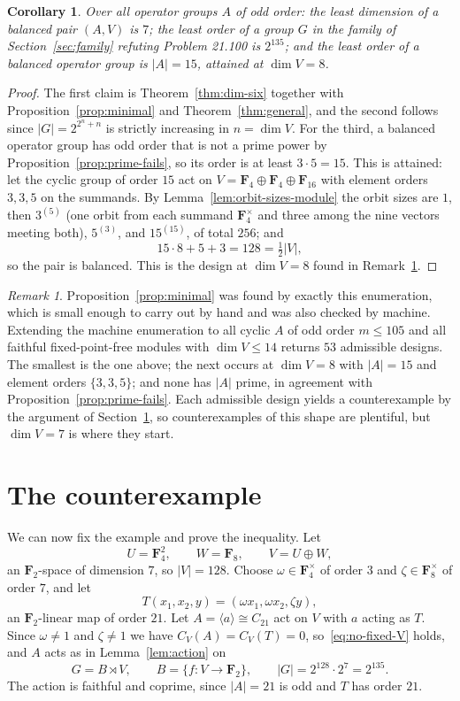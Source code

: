 \documentclass[11pt,a4paper,reqno]{amsart}
\newtheorem{corollary}[theorem]{Corollary}
\theoremstyle{definition}
\theoremstyle{remark}
\newtheorem{remark}[theorem]{Remark}
\newcommand{\F}{\mathbf F}
\begin{document}
\begin{corollary}\label{cor:minima}
Over all operator groups $A$ of odd order:
the least dimension of a balanced pair $(A,V)$ is $7$; the least order
of a group $G$ in the family of Section~\ref{sec:family} refuting
Problem 21.100 is $2^{135}$; and the least order of a balanced operator
group is $|A|=15$, attained at $\dim V=8$.
\end{corollary}

\begin{proof}
The first claim is Theorem~\ref{thm:dim-six} together with
Proposition~\ref{prop:minimal} and Theorem~\ref{thm:general}, and the
second follows since
$|G|=2^{2^n+n}$ is strictly increasing in $n=\dim V$.  For the third,
a balanced operator group has odd order that is not a prime power by
Proposition~\ref{prop:prime-fails}, so its order is at least
$3\cdot5=15$.  This is attained: let the cyclic group of order
$15$ act on $V=\F_4\oplus\F_4\oplus\F_{16}$ with element orders
$3,3,5$ on the summands.  By Lemma~\ref{lem:orbit-sizes-module} the
orbit sizes are $1$, then $3^{(5)}$ (one orbit from each summand
$\F_4^\times$ and three among the nine vectors meeting both),
$5^{(3)}$, and $15^{(15)}$, of total $256$; and
\[
 15\cdot8+5+3=128=\tfrac12|V| ,
\]
so the pair is balanced.  This is the design at $\dim V=8$ found in
Remark~\ref{rem:search}.
\end{proof}

\begin{remark}\label{rem:search}
Proposition~\ref{prop:minimal} was found by exactly this enumeration,
which is small enough to carry out by hand and was also checked by
machine.  Extending the machine enumeration to all cyclic $A$ of odd
order $m\le105$ and all faithful fixed-point-free modules with
$\dim V\le14$ returns $53$ admissible designs.  The smallest is the one
above; the next occurs at $\dim V=8$ with $|A|=15$ and element orders
$\{3,3,5\}$; and none has $|A|$ prime, in agreement with
Proposition~\ref{prop:prime-fails}.  Each admissible design yields a
counterexample by the argument of Section~\ref{sec:short}, so
counterexamples of this shape are plentiful, but $\dim V=7$ is where
they start.
\end{remark}

\section{The counterexample}\label{sec:short}

We can now fix the example and prove the inequality.  Let
\[
 U=\F_4^2,\qquad W=\F_8,\qquad V=U\oplus W,
\]
an $\F_2$-space of dimension $7$, so $|V|=128$.  Choose
$\omega\in\F_4^\times$ of order $3$ and $\zeta\in\F_8^\times$ of order
$7$, and let
\[
 T(x_1,x_2,y)=(\omega x_1,\omega x_2,\zeta y),
\]
an $\F_2$-linear map of order $21$.  Let $A=\langle a\rangle\cong C_{21}$
act on $V$ with $a$ acting as $T$.  Since $\omega\neq1$ and
$\zeta\neq1$ we have $C_V(A)=C_V(T)=0$, so~\eqref{eq:no-fixed-V} holds,
and $A$ acts as in Lemma~\ref{lem:action} on
\[
 G=B\rtimes V,
 \qquad B=\{f:V\to\F_2\},
 \qquad |G|=2^{128}\cdot2^7=2^{135}.
\]
The action is faithful and coprime, since $|A|=21$ is odd and $T$ has
order $21$.
\end{document}
